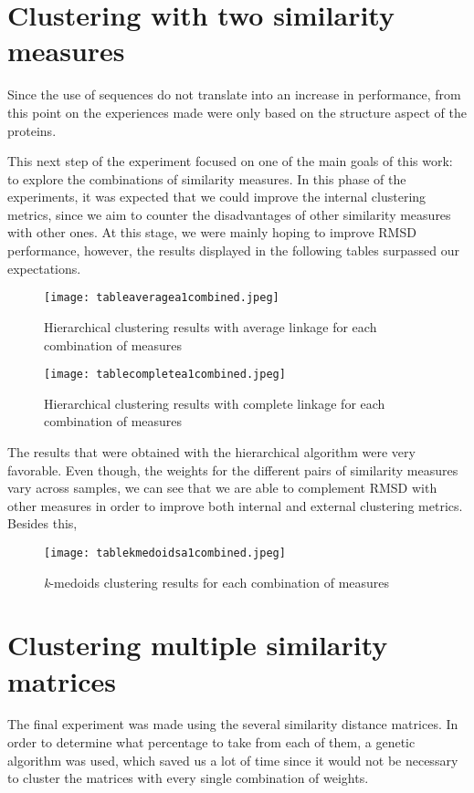 \section{Clustering with two similarity measures}

Since the use of sequences do not translate into an increase in performance, from this point on the experiences made were only based on the structure aspect of the proteins.

This next step of the experiment focused on one of the main goals of this work: to explore the combinations of similarity measures. In this phase of the experiments, it was expected that we could improve the internal clustering metrics, since we aim to counter the disadvantages of other similarity measures with other ones. At this stage, we were mainly hoping to improve RMSD performance, however, the results displayed in the following tables surpassed our expectations.

\begin{figure}[H]
	\centering
	\texttt{[image: tableaveragea1combined.jpeg]}
	\caption{Hierarchical clustering results with average linkage for each combination of measures}
	\label{}
\end{figure}

\begin{figure}[H]
	\centering
	\texttt{[image: tablecompletea1combined.jpeg]}
	\caption{Hierarchical clustering results with complete linkage for each combination of measures}
	\label{}
\end{figure}

The results that were obtained with the hierarchical algorithm were very favorable. Even though, the weights for the different pairs of similarity measures vary across samples, we can see that we are able to complement RMSD with other measures in order to improve both internal and external clustering metrics. Besides this, 

\begin{figure}[H]
	\centering
	\texttt{[image: tablekmedoidsa1combined.jpeg]}
	\caption{\textit{k}-medoids clustering results for each combination of measures}
	\label{}
\end{figure}


\section{Clustering multiple similarity matrices}

The final experiment was made using the several similarity distance matrices. In order to determine what percentage to take from each of them, a genetic algorithm was used, which saved us a lot of time since it would not be necessary to cluster the matrices with every single combination of weights. 

